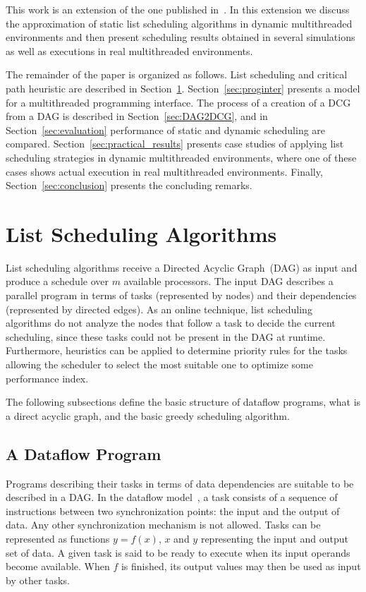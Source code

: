 \documentclass[twocolumn]{svjour3}
\begin{document}
This work is an extension of the one published in~\cite{CiceroHPCLatam2012}. In this extension we discuss the approximation of static list scheduling algorithms in dynamic multithreaded environments and then present scheduling results obtained in several simulations as well as executions in real multithreaded environments.

The remainder of the paper is organized as follows. List scheduling and critical path heuristic are described in Section~\ref{sec:listscheduling}. Section~\ref{sec:proginter} presents a model for a multithreaded programming interface. The process of a creation of a DCG from a DAG is described in Section~\ref{sec:DAG2DCG}, and in Section~\ref{sec:evaluation} performance of static and dynamic scheduling are compared. Section~\ref{sec:practical_results} presents case studies of applying list scheduling strategies in dynamic multithreaded environments, where one of these cases shows actual execution in real multithreaded environments. Finally,  Section~\ref{sec:conclusion} presents the concluding remarks.

\section{List Scheduling Algorithms} \label{sec:listscheduling}

List scheduling algorithms receive a Directed Acyclic Graph~(DAG) as input and produce a schedule over $m$ available processors. The input DAG describes a parallel program in terms of tasks (represented by nodes) and their {\color{blue}dependencies} (represented by directed edges). As an online technique, list scheduling algorithms do not analyze the nodes that follow a task to decide the current scheduling, since these tasks could not be present in the DAG at runtime. Furthermore, heuristics can be applied to determine priority rules for the tasks allowing the scheduler to select the most suitable one to optimize some performance index.

The following subsections define the basic structure of dataflow programs, what is a direct acyclic graph, and the basic greedy scheduling algorithm. 

\subsection{A Dataflow Program}

Programs describing their tasks in terms of data {\color{blue}dependencies} are suitable to be described in a DAG. In the dataflow model~\cite{dataflowAdvances2004}, a task consists of a sequence of instructions between two synchronization points: the input and the output of data. Any other synchronization mechanism is not allowed. Tasks can be represented as functions $y= f(x)$, $x$ and $y$ representing the input and output set of data. A given task is said to be ready to execute when its input operands become available. When $f$ is finished, its output values may then be {\color{blue}used} as input by other tasks. 
\end{document}
